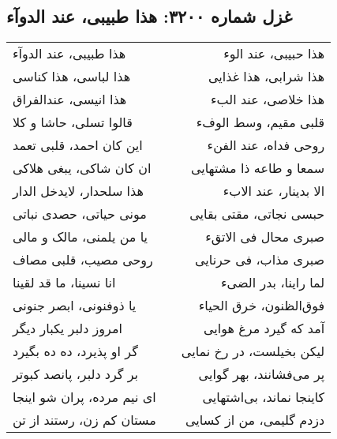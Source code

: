 \begin{center}
\section*{غزل شماره ۳۲۰۰: هذا طبیبی، عند الدوآء}
\label{sec:3200}
\begin{longtable}{l p{0.5cm} r}
هذا طبیبی، عند الدوآء
&&
هذا حبیبی، عند الوء
\\
هذا لباسی، هذا کناسی
&&
هذا شرابی، هذا غذایی
\\
هذا انیسی، عندالفراق
&&
هذا خلاصی، عند البء
\\
قالوا تسلی، حاشا و کلا
&&
قلبی مقیم، وسط الوفء
\\
این کان احمد، قلبی تعمد
&&
روحی فداه، عند الفنء
\\
ان کان شاکی، یبغی هلاکی
&&
سمعا و طاعه ذا مشتهایی
\\
هذا سلحدار، لایدخل الدار
&&
الا بدینار، عند الابء
\\
مونی حیاتی، حصدی نباتی
&&
حبسی نجاتی، مقتی بقایی
\\
یا من یلمنی، مالک و مالی
&&
صبری محال فی الاتقء
\\
روحی مصیب، قلبی مصاف
&&
صبری مذاب، فی حرنایی
\\
انا نسینا، ما قد لقینا
&&
لما راینا، بدر الضیء
\\
یا ذوفنونی، ابصر جنونی
&&
فوق‌الظنون، خرق الحیاء
\\
امروز دلبر یکبار دیگر
&&
آمد که گیرد مرغ هوایی
\\
گر او پذیرد، ده ده بگیرد
&&
لیکن بخیلست، در رخ نمایی
\\
بر گرد دلبر، پانصد کبوتر
&&
پر می‌فشانند، بهر گوایی
\\
ای نیم مرده، پران شو اینجا
&&
کاینجا نماند، بی‌اشتهایی
\\
مستان کم زن، رستند از تن
&&
دزدم گلیمی، من از کسایی
\\
\end{longtable}
\end{center}

